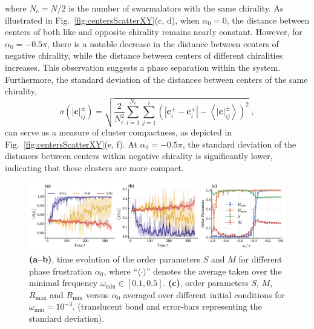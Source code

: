 \documentclass{article}
\begin{document}
where $N_c=N/2$ is the number of swarmalators with the same chirality. 
As illustrated in Fig.~\ref{fig:centersScatterXY}(c, d), when $\alpha_0 = 0$, the distance between centers of both like and opposite chirality remains nearly constant. However, for $\alpha_0 = -0.5\pi$, there is a notable decrease in the distance between centers of negative chirality, while the distance between centers of different chiralities increases. This observation suggests a phase separation within the system. Furthermore, the standard deviation of the distances between centers of the same chirality,
\begin{equation}
    \sigma ( \left| \mathbf{c} \right|_{ij}^{\pm} ) =\sqrt{\frac{2}{N_{c}^{2}}\sum_{i=1}^{N_c}{\sum_{j=1}^i{\left( \left| \mathbf{c}_{i}^{\pm}-\mathbf{c}_{i}^{\pm} \right|-\left< \left| \mathbf{c} \right|_{ij}^{\pm} \right> \right) ^2}}}\;,
\end{equation}
can serve as a measure of cluster compactness, as depicted in Fig.~\ref{fig:centersScatterXY}(e, f). At $\alpha_0 = -0.5\pi$, the standard deviation of the distances between centers within negative chirality is significantly lower, indicating that these clusters are more compact.

\begin{figure}
    \includegraphics[width=\textwidth]{./figs/orderParameters.pdf}
    \caption{
        \label{fig:orderParameters} 
        \textbf{(a--b)}, time evolution of the order parameters $S$ and $M$ for different phase frustration $\alpha_0$, where \enquote{$\langle\cdot\rangle$} denotes the average taken over the minimal frequency $\omega_{\min}\in\left[0.1, 0.5\right]$.
        \textbf{(c)}, order parameters $S$, $M$, $R_{\max}$ and $R_{\min}$ versus $\alpha_0$ averaged over different initial conditions for $\omega_{\min}=10^{-3}$.
        (translucent bond and error-bars representing the standard deviation).
    }
\end{figure}
\end{document}
